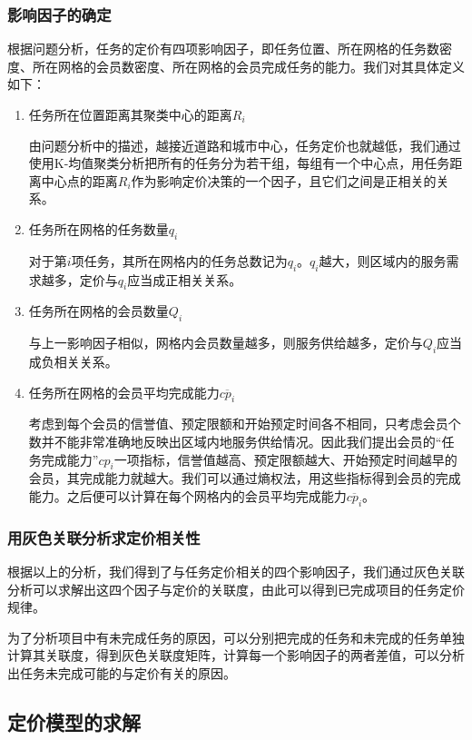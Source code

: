 \documentclass[withoutpreface,bwprint]{cumcmthesis} %
\begin{document}
\subsubsection{影响因子的确定}
根据问题分析，任务的定价有四项影响因子，即任务位置、所在网格的任务数密度、所在网格的会员数密度、所在网格的会员完成任务的能力。我们对其具体定义如下：
\begin{enumerate}
    \item 任务所在位置距离其聚类中心的距离$R_i$

          由问题分析中的描述，越接近道路和城市中心，任务定价也就越低，我们通过使用K-均值聚类分析把所有的任务分为若干组，每组有一个中心点，用任务距离中心点的距离$R_i$作为影响定价决策的一个因子，且它们之间是正相关的关系。
    \item 任务所在网格的任务数量$q_i$

          对于第$i$项任务，其所在网格内的任务总数记为$q_i$。$q_i$越大，则区域内的服务需求越多，定价与$q_i$应当成正相关关系。
    \item 任务所在网格的会员数量$Q_i$

          与上一影响因子相似，网格内会员数量越多，则服务供给越多，定价与$Q_i$应当成负相关关系。
    \item 任务所在网格的会员平均完成能力$\overline{cp_i}$

          考虑到每个会员的信誉值、预定限额和开始预定时间各不相同，只考虑会员个数并不能非常准确地反映出区域内地服务供给情况。因此我们提出会员的“任务完成能力”$cp_i$一项指标，信誉值越高、预定限额越大、开始预定时间越早的会员，其完成能力就越大。我们可以通过熵权法，用这些指标得到会员的完成能力。之后便可以计算在每个网格内的会员平均完成能力$\overline{cp_i}$。
\end{enumerate}

\subsubsection{用灰色关联分析求定价相关性}

根据以上的分析，我们得到了与任务定价相关的四个影响因子，我们通过灰色关联分析可以求解出这四个因子与定价的关联度，由此可以得到已完成项目的任务定价规律。

为了分析项目中有未完成任务的原因，可以分别把完成的任务和未完成的任务单独计算其关联度，得到灰色关联度矩阵，计算每一个影响因子的两者差值，可以分析出任务未完成可能的与定价有关的原因。

\subsection{定价模型的求解}
\end{document}
